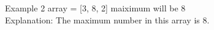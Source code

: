 \documentclass[preview]{standalone}
\begin{document}
Example 2 array = [3, 8, 2] maiximum will be 8\\Explanation: The maximum number in this array is 8.\\
\end{document}
